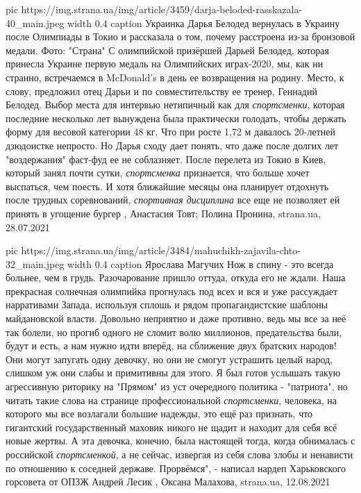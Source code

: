 \ifcmt
  pic https://img.strana.ua/img/article/3459/darja-beloded-rasskazala-40_main.jpeg
  width 0.4
  caption Украинка Дарья Белодед вернулась в Украину после Олимпиады в Токио и рассказала о том, почему расстроена из-за бронзовой медали. Фото: "Страна"
\fi
С олимпийской призёршей Дарьей Белодед, которая принесла Украине первую медаль
на Олимпийских играх-2020, мы, как ни странно, встречаемся в McDonald's в день
ее возвращения на родину. Место, к слову, предложил отец Дарьи и по
совместительству ее тренер, Геннадий Белодед.  Выбор места для интервью
нетипичный как для \emph{спортсменки}, которая последние несколько лет вынуждена была
практически голодать, чтобы держать форму для весовой категории 48 кг. Что при
росте 1,72 м давалось 20-летней дзюдоистке непросто.  Но Дарья сходу дает
понять, что даже после долгих лет "воздержания" фаст-фуд ее не соблазняет.
После перелета из Токио в Киев, который занял почти сутки, \emph{спортсменка}
признается, что больше хочет выспаться, чем поесть. И хотя ближайшие месяцы она
планирует отдохнуть после трудных соревнований, \emph{спортивная дисциплина} все еще
не позволяет ей принять в угощение бургер
, 
Анастасия Товт; Полина Пронина, strana.ua, 28.07.2021

\ifcmt
  pic https://img.strana.ua/img/article/3484/mahuchikh-zajavila-chto-32_main.jpeg
  width 0.4
  caption Ярослава Магучих
\fi
Нож в спину - это всегда больнее, чем в грудь. Разочарование пришло оттуда,
откуда его не ждали. Наша прекрасная солнечная олимпийка прогнулась под всех и
вся и уже рассуждает нарративами Запада, используя сплошь и рядом
пропагандистские шаблоны майдановской власти. Довольно неприятно и даже
противно, ведь мы все за неё так болели, но прогиб одного не сломит волю
миллионов, предательства были, будут и есть, а нам нужно идти вперёд, на
сближение двух братских народов! Они могут запугать одну девочку, но они не
смогут устрашить целый народ, слишком уж они слабы и примитивны для этого.  Я
был готов услышать такую агрессивную риторику на "Прямом" из уст очередного
политика - "патриота", но читать такие слова на странице профессиональной
\emph{спортсменки}, человека, на которого мы все возлагали большие надежды, это ещё
раз признать, что гигантский государственный маховик никого не щадит и находит
для себя всё новые жертвы. А эта девочка, конечно, была настоящей тогда, когда
обнималась с российской \emph{спортсменкой}, а не сейчас, извергая из себя слова злобы
и ненависти по отношению к соседней державе. Прорвёмся", - написал нардеп
Харьковского горсовета от ОПЗЖ Андрей Лесик
, 
Оксана Малахова, strana.ua, 12.08.2021


